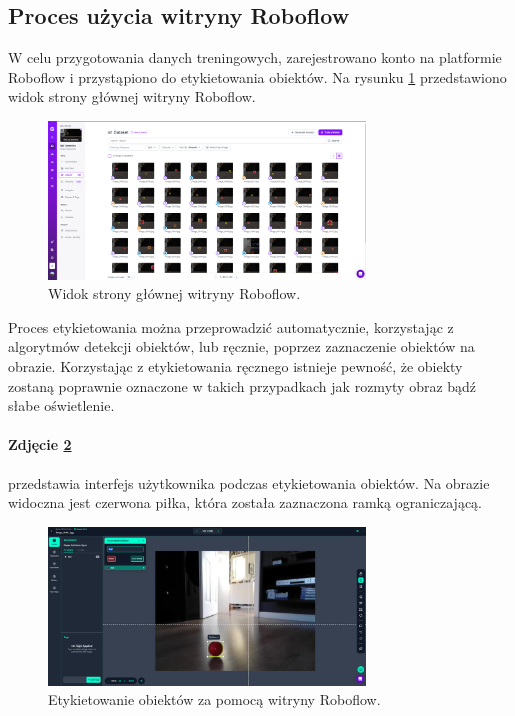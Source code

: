 \documentclass[a4paper,twoside,12pt]{book}
\begin{document}
\newpage

\subsection{Proces użycia witryny Roboflow}
W celu przygotowania danych treningowych, zarejestrowano konto na platformie Roboflow i przystąpiono do etykietowania obiektów. Na rysunku \ref{fig:roboflow-main} przedstawiono widok strony głównej witryny Roboflow.

\begin{figure}[h]
	\centering
	\includegraphics[width=0.75\textwidth]{Images/Roboflow/mainscreen.png}
	\caption{Widok strony głównej witryny Roboflow.}
	\label{fig:roboflow-main}
\end{figure}

Proces etykietowania można przeprowadzić automatycznie, korzystając z algorytmów detekcji obiektów, lub ręcznie, poprzez zaznaczenie obiektów na obrazie. Korzystając z etykietowania ręcznego istnieje pewność, że obiekty zostaną poprawnie oznaczone w takich przypadkach jak rozmyty obraz bądź słabe oświetlenie. 


\paragraph{Zdjęcie \ref{fig:labeling1}}
przedstawia interfejs użytkownika podczas etykietowania obiektów. Na obrazie widoczna jest czerwona piłka, która została zaznaczona ramką ograniczającą.

\begin{figure}[h]
	\centering
	\includegraphics[width=0.75\textwidth]{Images/Roboflow/labeling1.png}
	\caption{Etykietowanie obiektów za pomocą witryny Roboflow.}
	\label{fig:labeling1}
\end{figure}
\end{document}
